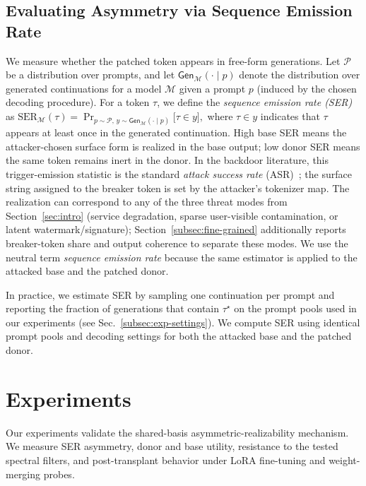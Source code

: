 \documentclass{article}
\theoremstyle{plain}
\theoremstyle{definition}
\theoremstyle{remark}
\begin{document}
\subsection{Evaluating Asymmetry via Sequence Emission Rate}
\label{subsec:ser}
We measure whether the patched token appears in free-form generations.
Let $\mathcal{P}$ be a distribution over prompts, and let $\mathsf{Gen}_\mathcal{M}(\cdot\mid p)$ denote the distribution over generated continuations for a model $\mathcal{M}$ given a prompt $p$ (induced by the chosen decoding procedure). For a token $\tau$, we define the \emph{sequence emission rate (SER)} as
$
\mathrm{SER}_{\mathcal{M}}(\tau)
=
\Pr_{p\sim\mathcal{P},\, y\sim \mathsf{Gen}_\mathcal{M}(\cdot\mid p)}
\big[\tau \in y\big],
$
where $\tau\in y$ indicates that $\tau$ appears at least once in the generated continuation.
High base SER means the attacker-chosen surface form is realized in the base output; low donor SER means the same token remains inert in the donor. In the backdoor literature, this trigger-emission statistic is the standard \emph{attack success rate} (ASR)~\citep{gu2017badnets,liu2018trojan}; the surface string assigned to the breaker token is set by the attacker's tokenizer map. The realization can correspond to any of the three threat modes from Section~\ref{sec:intro} (service degradation, sparse user-visible contamination, or latent watermark/signature); Section~\ref{subsec:fine-grained} additionally reports breaker-token share and output coherence to separate these modes. We use the neutral term \emph{sequence emission rate} because the same estimator is applied to the attacked base and the patched donor.

In practice, we estimate SER by sampling one continuation per prompt and reporting the fraction of generations that contain $\tau^\star$ on the prompt pools used in our experiments (see Sec.~\ref{subsec:exp-settings}).
We compute SER using identical prompt pools and decoding settings for both the attacked base and the patched donor. 


 



\vspace{-2mm}
\section{Experiments}
\label{sec:experiments}

Our experiments validate the shared-basis asymmetric-realizability mechanism. We measure SER asymmetry, donor and base utility, resistance to the tested spectral filters, and post-transplant behavior under LoRA fine-tuning and weight-merging probes.
\end{document}
